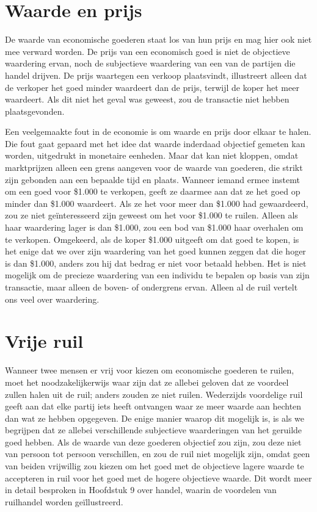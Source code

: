 \clearpage
\section{Waarde en prijs}

De waarde van economische goederen staat los van hun prijs en mag hier ook niet mee verward worden. De prijs van een economisch goed is niet de objectieve waardering ervan, noch de subjectieve waardering van een van de partijen die handel drijven. De prijs waartegen een verkoop plaatsvindt, illustreert alleen dat de verkoper het goed minder waardeert dan de prijs, terwijl de koper het meer waardeert. Als dit niet het geval was geweest, zou de transactie niet hebben plaatsgevonden.

Een veelgemaakte fout in de economie is om waarde en prijs door elkaar te halen. Die fout gaat gepaard met het idee dat waarde inderdaad objectief gemeten kan worden, uitgedrukt in monetaire eenheden. Maar dat kan niet kloppen, omdat marktprijzen alleen een grens aangeven voor de waarde van goederen, die strikt zijn gebonden aan een bepaalde tijd en plaats. Wanneer iemand ermee instemt om een goed voor \$1.000 te verkopen, geeft ze daarmee aan dat ze het goed op minder dan \$1.000 waardeert. Als ze het voor meer dan \$1.000 had gewaardeerd, zou ze niet geïnteresseerd zijn geweest om het voor \$1.000 te ruilen. Alleen als haar waardering lager is dan \$1.000, zou een bod van \$1.000 haar overhalen om te verkopen. Omgekeerd, als de koper \$1.000 uitgeeft om dat goed te kopen, is het enige dat we over zijn waardering van het goed kunnen zeggen dat die hoger is dan \$1.000, anders zou hij dat bedrag er niet voor betaald hebben. Het is niet mogelijk om de precieze waardering van een individu te bepalen op basis van zijn transactie, maar alleen de boven- of ondergrens ervan. Alleen al de ruil vertelt ons veel over waardering.

\section{Vrije ruil}

Wanneer twee mensen er vrij voor kiezen om economische goederen te ruilen, moet het noodzakelijkerwijs waar zijn dat ze allebei geloven dat ze voordeel zullen halen uit de ruil; anders zouden ze niet ruilen. Wederzijds voordelige ruil geeft aan dat elke partij iets heeft ontvangen waar ze meer waarde aan hechten dan wat ze hebben opgegeven. De enige manier waarop dit mogelijk is, is als we begrijpen dat ze allebei verschillende subjectieve waarderingen van het geruilde goed hebben. Als de waarde van deze goederen objectief zou zijn, zou deze niet van persoon tot persoon verschillen, en zou de ruil niet mogelijk zijn, omdat geen van beiden vrijwillig zou kiezen om het goed met de objectieve lagere waarde te accepteren in ruil voor het goed met de hogere objectieve waarde. Dit wordt meer in detail besproken in Hoofdstuk 9 over handel, waarin de voordelen van ruilhandel worden geïllustreerd.


